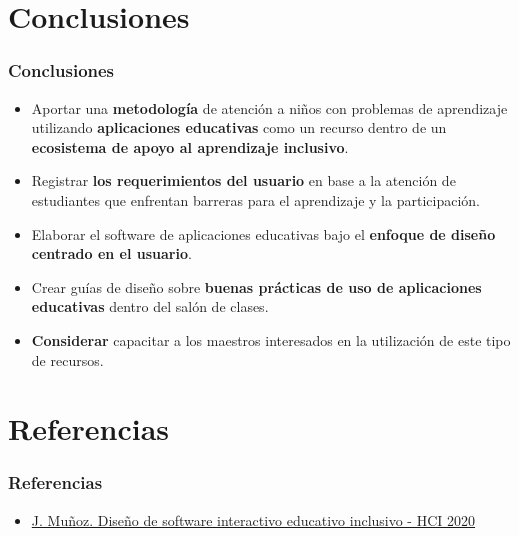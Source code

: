 \documentclass[11pt]{beamer}
\begin{document}
\section{Conclusiones}
\begin{frame}
\frametitle{Conclusiones}
\begin{itemize}
\item Aportar una {\bf metodología} de atención a niños con problemas de aprendizaje utilizando {\bf aplicaciones educativas} como un recurso dentro de un {\bf ecosistema de apoyo al aprendizaje inclusivo}.
\item Registrar {\bf los requerimientos del usuario} en base a la atención de estudiantes que enfrentan barreras para el aprendizaje y la participación.
\item Elaborar el software de aplicaciones educativas bajo el {\bf enfoque de diseño centrado en el usuario}.
\item Crear guías de diseño sobre {\bf buenas prácticas de uso de aplicaciones educativas} dentro del salón de clases.
\item {\bf Considerar} capacitar a los maestros interesados en la utilización de este tipo de recursos.
\end{itemize}
\end{frame}

\section{Referencias}
\begin{frame}
\frametitle{Referencias}
\begin{itemize}
\item \href{https://www.youtube.com/watch?v=F0nOl4GRfC4&t=1577s}{J. Muñoz. Diseño de software interactivo educativo inclusivo - HCI 2020}
\end{itemize}
\end{frame}
\end{document}
